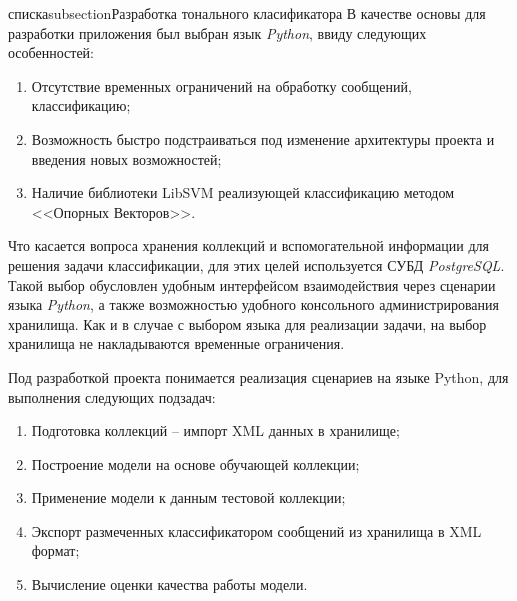 спискаsubsection{Разработка тонального класификатора}
    В качестве основы для разработки приложения был выбран язык {\it Python},
    ввиду следующих особенностей:
    \begin{enumerate}
        \item Отсутствие временных ограничений на обработку сообщений,
            классификацию;
        \item Возможность быстро подстраиваться под изменение архитектуры
            проекта и введения новых возможностей;
        \item Наличие библиотеки LibSVM реализующей
            классификацию методом <<Опорных Векторов>>.\cite{svmClassifier}
    \end{enumerate}

    Что касается вопроса хранения коллекций и вспомогательной информации
    для решения задачи классификации, для этих целей используется СУБД
    {\it PostgreSQL}. Такой выбор обусловлен удобным интерфейсом взаимодействия
    через сценарии языка {\it Python}, а также возможностью удобного консольного
    администрирования хранилища. Как и в случае с выбором языка для реализации
    задачи, на выбор хранилища не накладываются временные ограничения.

    Под разработкой проекта понимается реализация сценариев на языке Python,
    для выполнения следующих подзадач:
    \begin{enumerate}
        \item Подготовка коллекций -- импорт XML данных в хранилище;
        \item Построение модели на основе обучающей коллекции;
        \item Применение модели к данным тестовой коллекции;
        \item Экспорт размеченных классификатором сообщений из хранилища в XML формат;
        \item Вычисление оценки качества работы модели.
    \end{enumerate}

